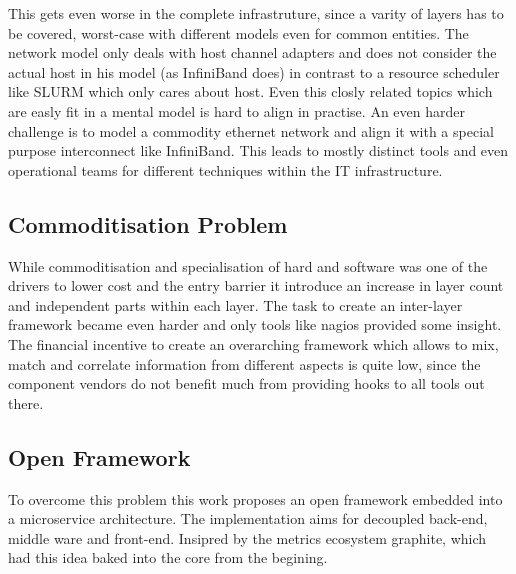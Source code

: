 This gets even worse in the complete infrastruture, since a varity of layers has to be covered, worst-case with different models even for common entities.
The network model only deals with host channel adapters and does not consider the actual host in his model (as InfiniBand does) in contrast to a resource
scheduler like SLURM which only cares about host. Even this closly related topics which are easly fit in a mental model is hard to align in practise.
An even harder challenge is to model a commodity ethernet network and align it with a special purpose interconnect like InfiniBand.
This leads to mostly distinct tools and even operational teams for different techniques within the IT infrastructure.

\subsection{Commoditisation Problem}
While commoditisation and specialisation of hard and software was one of the drivers to lower cost and the entry barrier it introduce an increase in layer count and
independent parts within each layer. The task to create an inter-layer framework became even harder and only tools like \gls{nagios} provided some insight.
The financial incentive to create an overarching framework which allows to mix, match and correlate information from different aspects is quite low, since the component vendors
do not benefit much from providing hooks to all tools out there.

\subsection{Open Framework}
To overcome this problem this work proposes an open framework embedded into a microservice architecture. The implementation aims for decoupled back-end, middle ware and front-end.
Insipred by the metrics ecosystem graphite, which had this idea baked into the core from the begining.